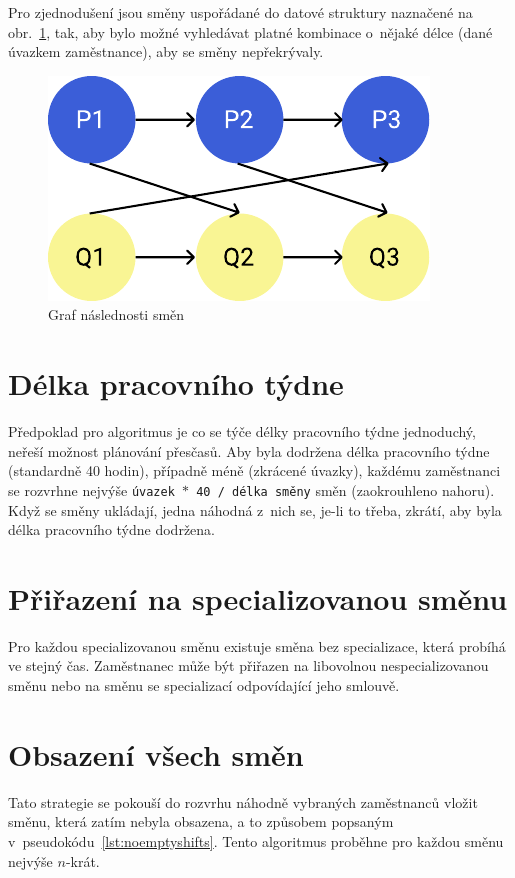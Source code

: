 \documentclass[twoside]{ctuthesis}
\begin{document}
Pro zjednodušení jsou směny uspořádané do datové struktury naznačené na obr.~\ref{fig:shiftprecedence}, tak, aby bylo možné vyhledávat platné kombinace o~nějaké délce (dané úvazkem zaměstnance), aby se směny nepřekrývaly.

\begin{figure}[h!]
	\includegraphics[scale=0.7]{img/shift-overlap-small.pdf}
	\caption{Graf následnosti směn}
	\label{fig:shiftprecedence}
\end{figure}


\section{Délka pracovního týdne}
Předpoklad pro algoritmus je co se týče délky pracovního týdne jednoduchý, neřeší možnost plánování přesčasů. Aby byla dodržena délka pracovního týdne (standardně 40 hodin), případně méně (zkrácené úvazky), každému zaměstnanci se rozvrhne nejvýše \texttt{úvazek $\ast$ 40 / délka směny} směn (zaokrouhleno nahoru). Když se směny ukládají, jedna náhodná z~nich se, je-li to třeba, zkrátí, aby byla délka pracovního týdne dodržena.

\section{Přiřazení na specializovanou směnu}

Pro každou specializovanou směnu existuje směna bez specializace, která probíhá ve stejný čas. Zaměstnanec může být přiřazen na libovolnou nespecializovanou směnu nebo na směnu se specializací odpovídající jeho smlouvě.

\section{Obsazení všech směn}
Tato strategie se pokouší do rozvrhu náhodně vybraných zaměstnanců vložit směnu, která zatím nebyla obsazena, a to způsobem popsaným v~pseudokódu~\ref{lst:noemptyshifts}. Tento algoritmus proběhne pro každou směnu nejvýše $n$-krát.
\end{document}
